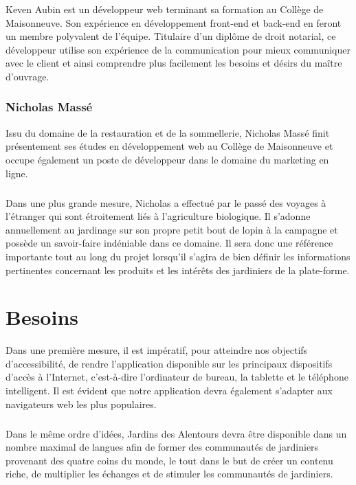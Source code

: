 \documentclass{scrreprt}
\def\projectname{Jardins des Alentours}
\begin{document}
Keven Aubin est un développeur web terminant sa formation au Collège de
Maisonneuve. Son expérience en développement front-end et back-end en
feront un membre polyvalent de l'équipe.
Titulaire d'un diplôme de droit notarial, ce développeur utilise son
expérience de la communication pour mieux communiquer avec le client et
ainsi comprendre plus facilement les besoins et désirs du maître
d'ouvrage.

\subsection{Nicholas Massé}

Issu du domaine de la restauration et de la sommellerie, Nicholas Massé finit
présentement ses études en développement web au Collège de Maisonneuve et occupe également
un poste de développeur dans le domaine du marketing en ligne.

\paragraph{}
Dans une plus grande mesure, Nicholas a effectué par le passé des voyages à
l'étranger qui sont étroitement liés à l'agriculture biologique.
Il s'adonne annuellement au jardinage sur son propre petit bout de lopin à
la campagne et possède un savoir-faire indéniable dans ce domaine. Il
sera donc une référence importante tout au long du projet lorsqu'il s'agira de
bien définir les informations pertinentes concernant les produits et les intérêts
des jardiniers de la plate-forme.

\chapter{Besoins}
Dans une première mesure, il est impératif, pour atteindre nos objectifs d'accessibilité,
de rendre l'application disponible sur les principaux dispositifs d'accès à
l'Internet, c'est-à-dire
l'ordinateur de bureau, la tablette et le téléphone intelligent. Il est évident que
notre application devra également s'adapter aux navigateurs web les plus populaires.

\paragraph{}
Dans le même ordre d'idées, \projectname{} devra être disponible dans un nombre
maximal de langues afin de former des communautés de jardiniers
provenant des quatre coins du monde, le tout dans le but de créer
un contenu riche, de multiplier les échanges et de stimuler les communautés de jardiniers.
\end{document}
